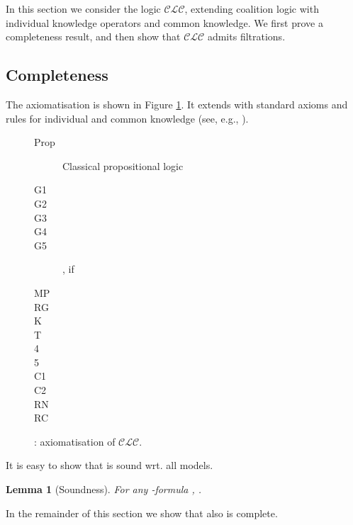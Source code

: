 \documentclass{article}
\newtheorem{lemma}{Lemma}
\newcommand{\acro}[1]{\ensuremath{\mathcal{#1}}}
\begin{document}
In this section we consider the logic \acro{CLC}, extending coalition
logic with individual knowledge operators and common knowledge. We
first prove a completeness result, and then show that \acro{CLC}
admits filtrations.

\subsection{Completeness}

The axiomatisation  is shown in Figure \ref{fig:clc-ax}. It extends
 with standard axioms and rules for individual and common knowledge
(see, e.g., \cite{Fagin1995}).

\begin{figure}[h]
  \centering
\begin{description}
\item[Prop] Classical propositional logic
\item[G1] 
\item[G2] 
\item[G3] 
\item[G4] 
\item[G5] , if 
\item[MP] 
\item[RG] 
\item[K] 
\item[T] 
\item[4] 
\item[5] 
\item[C1] 
\item[C2] 
\item[RN] 
\item[RC] 
\end{description}
  \caption{: axiomatisation of \acro{CLC}.}
  \label{fig:clc-ax}
\end{figure}

It is easy to show that  is sound wrt. all models.
\begin{lemma}[Soundness]
  For any -formula , .
\end{lemma}
In the remainder of this section we show that  also is complete.
\end{document}
